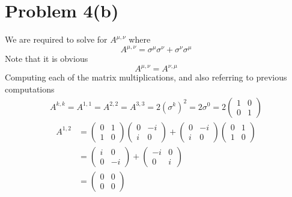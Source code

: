 \documentclass[letter]{article}
\begin{document}
\section*{Problem 4(b)}
We are required to solve for $A^{\mu, \nu}$ where
\[
A^{\mu, \nu} = \sigma^{\mu} \sigma^{\nu} + \sigma^{\nu} \sigma^{\mu}
\] Note that it is obvious 
\[
A^{\mu, \nu} = A^{\nu , \mu}
\] 
Computing each of the matrix multiplications, and also referring to previous computations
\begin{align*}
	A^{k,k} = A^{1,1} = A^{2,2} = A^{3,3} = 2 (\sigma^{k})^2  = 2 \sigma^{0} = 
	2 \begin{pmatrix} 1 & 0 \\ 0 & 1 \end{pmatrix} 
\end{align*}
\begin{align*}
	A^{1,2} &=  
	\begin{pmatrix} 0 & 1 \\ 1 & 0 \end{pmatrix} 
	\begin{pmatrix} 0 & -i \\ i & 0 \end{pmatrix} 
+
	\begin{pmatrix} 0 & -i \\ i & 0 \end{pmatrix} 
	\begin{pmatrix} 0 & 1 \\ 1 & 0 \end{pmatrix}  \\ 
	&= 
	\begin{pmatrix} i & 0 \\ 0 & -i \end{pmatrix} + 
	\begin{pmatrix} -i & 0 \\ 0 & i \end{pmatrix} 
	\\	&=   \begin{pmatrix} 0 & 0 \\ 0 & 0 \end{pmatrix} 
\end{align*}
\end{document}
